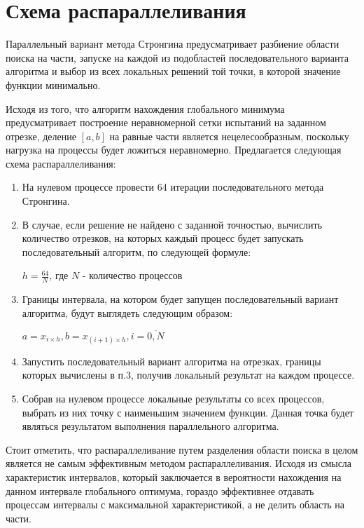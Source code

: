 \documentclass{report}
\begin{document}
\section*{Схема распараллеливания}
Параллельный вариант метода Стронгина предусматривает разбиение области поиска на части, запуске на каждой из подобластей последовательного варианта алгоритма и выбор из всех локальных решений той точки, в которой значение функции минимально.
\par Исходя из того, что алгоритм нахождения глобального минимума предусматривает построение неравномерной сетки испытаний на заданном отрезке, деление $[a,b]$ на равные части является нецелесообразным, поскольку нагрузка на процессы будет ложиться неравномерно. Предлагается следующая схема распараллеливания:\par
\begin{enumerate}
	\item На нулевом процессе провести 64 итерации последовательного метода Стронгина.
	\item В случае, если решение не найдено с заданной точностью, вычислить количество отрезков, на которых каждый процесс будет запускать последовательный алгоритм, по следующей формуле:\par
	$h = \frac{64}{N}$, где $N$ - количество процессов
	\item Границы интервала, на котором будет запущен последовательный вариант алгоритма, будут выглядеть следующим образом:\par
	$a = x_{i\times{}h}, b = x_{(i+1)\times{}h}, i = \overline{0,N} $
	\item Запустить последовательный вариант алгоритма на отрезках, границы которых вычислены в п.3, получив локальный результат на каждом процессе.
	\item Собрав на нулевом процессе локальные результаты со всех процессов, выбрать из них точку с наименьшим значением функции. Данная точка будет являться результатом выполнения параллельного алгоритма.
\end{enumerate}
\par Стоит отметить, что распараллеливание путем разделения области поиска в целом является не самым эффективным методом распараллеливания. Исходя из смысла характеристик интервалов, который заключается в вероятности нахождения на данном интервале глобального оптимума, гораздо эффективнее отдавать процессам интервалы с максимальной характеристикой, а не делить область на части.
\newpage
\end{document}
